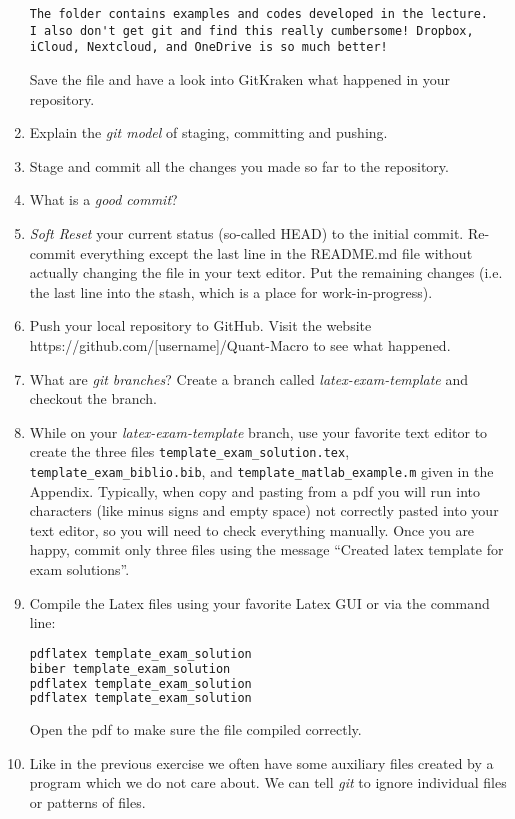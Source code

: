 \begin{enumerate}
\begin{lstlisting}[basicstyle=\scriptsize\mlttfamily]
The folder contains examples and codes developed in the lecture.
I also don't get git and find this really cumbersome! Dropbox, iCloud, Nextcloud, and OneDrive is so much better!
\end{lstlisting}
	Save the file and have a look into GitKraken what happened in your repository.
	\item Explain the \emph{git model} of staging, committing and pushing.
	\item Stage and commit all the changes you made so far to the repository.
	\item What is a \emph{good commit}?
	\item \emph{Soft Reset} your current status (so-called HEAD) to the initial commit.
	Re-commit everything except the last line in the README.md file without actually changing the file in your text editor.
	Put the remaining changes (i.e. the last line into the stash, which is a place for work-in-progress).
	\item Push your local repository to GitHub.
	Visit the website https://github.com/[username]/Quant-Macro to see what happened.
	\item What are \emph{git branches}? Create a branch called \emph{latex-exam-template} and checkout the branch.
	\item While on your \emph{latex-exam-template} branch, use your favorite text editor
	  to create the three files \texttt{template\_exam\_solution.tex}, \texttt{template\_exam\_biblio.bib}, and \texttt{template\_matlab\_example.m}
	  given in the Appendix.
	  Typically, when copy and pasting from a pdf you will run into characters (like minus signs and empty space) not correctly pasted into your text editor,
		so you will need to check everything manually.
      Once you are happy, commit only three files using the message \enquote{Created latex template for exam solutions}.
	\item Compile the Latex files using your favorite Latex GUI or via the command line:
\begin{lstlisting}[language=tex,frame=single,basicstyle=\scriptsize\mlttfamily]
pdflatex template_exam_solution
biber template_exam_solution
pdflatex template_exam_solution
pdflatex template_exam_solution
\end{lstlisting}
Open the pdf to make sure the file compiled correctly.
	\item Like in the previous exercise we often have some auxiliary files created by a program which we do not care about.
	We can tell \emph{git} to ignore individual files or patterns of files.

\end{enumerate}
